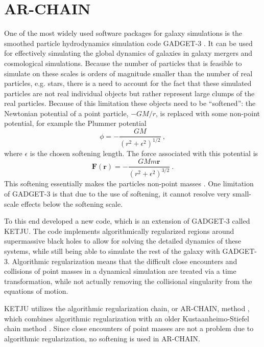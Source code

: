 \documentclass[english, oneside]{HYgradu}
\begin{document}
\chapter{AR-CHAIN} \label{chap:ar-chain}

One of the most widely used software packages for galaxy simulations is the smoothed particle hydrodynamics simulation code GADGET-3 \citep{springel:2005}. It can be used for effectively simulating the global dynamics of galaxies in galaxy mergers and cosmological simulations. Because the number of particles that is feasible to simulate on these scales is orders of magnitude smaller than the number of real particles, e.g. stars, there is a need to account for the fact that these simulated particles are not real individual objects but rather represent large clumps of the real particles. Because of this limitation these objects need to be ``softened'': the Newtonian potential of a point particle, $-GM/r$, is replaced with some non-point potential, for example the Plummer potential
\begin{equation}
\phi = -\frac{GM}{(r^2 + \epsilon^2)^{1/2}} \ ,
\end{equation}
where $\epsilon$ is the chosen softening length. The force associated with this potential is
\begin{equation}
\mathbf{F(r)} = -\frac{GMm \mathbf{r}}{(r^2 + \epsilon^2)^{3/2}} \ .
\end{equation}
This softening essentially makes the particles non-point masses \citep{zhang:2019}. One limitation of GADGET-3 is that due to the use of softening, it cannot resolve very small-scale effects below the softening scale.

To this end \cite{rantala:2017} developed a new code, which is an extension of GADGET-3 called KETJU. The code implements algorithmically regularized regions around supermassive black holes to allow for solving the detailed dynamics of these systems, while still being able to simulate the rest of the galaxy with GADGET-3. Algorithmic regularization means that the difficult close encounters and collisions of point masses in a dynamical simulation are treated via a time transformation, while not actually removing the collisional singularity from the equations of motion.

KETJU utilizes the algorithmic regularization chain, or AR-CHAIN, method \citep{mikkola:2002, mikkola:2006,mikkola:2008b}, which combines algorithmic regularization with an older Kustaanheimo-Stiefel chain method \citep{mikkola:1993}. Since close encounters of point masses are not a problem due to algorithmic regularization, no softening is used in AR-CHAIN.
\end{document}
